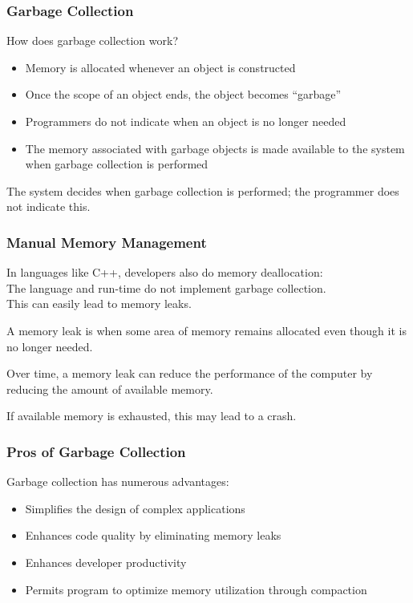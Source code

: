 \begin{frame}
\frametitle{Garbage Collection}

How does garbage collection work?
\begin{itemize}
\item Memory is allocated whenever an object is constructed
\item Once the scope of an object ends, the object becomes ``garbage''
\item Programmers do not indicate when an object is no longer needed
\item The memory associated with garbage objects is made available to the system when garbage collection is performed
\end{itemize}

The system decides when garbage collection is performed; the programmer does not indicate this. 

\end{frame}

\begin{frame}
\frametitle{Manual Memory Management}

In languages like C++, developers also do memory deallocation:\\
\quad The language and run-time do not implement garbage collection.\\
\quad This can easily lead to \alert{memory leaks}.

A memory leak is when some area of memory remains allocated even though it is no longer needed.

Over time, a memory leak can reduce the performance of the computer by reducing the amount of available memory. 

If available memory is exhausted, this may lead to a crash.

\end{frame}

\begin{frame}
\frametitle{Pros of Garbage Collection}
Garbage collection has numerous advantages:

\begin{itemize}
	\item Simplifies the design of complex applications
	\item Enhances code quality by eliminating memory leaks
	\item Enhances developer productivity
	\item Permits program to optimize memory utilization through compaction
\end{itemize}
\end{frame}

